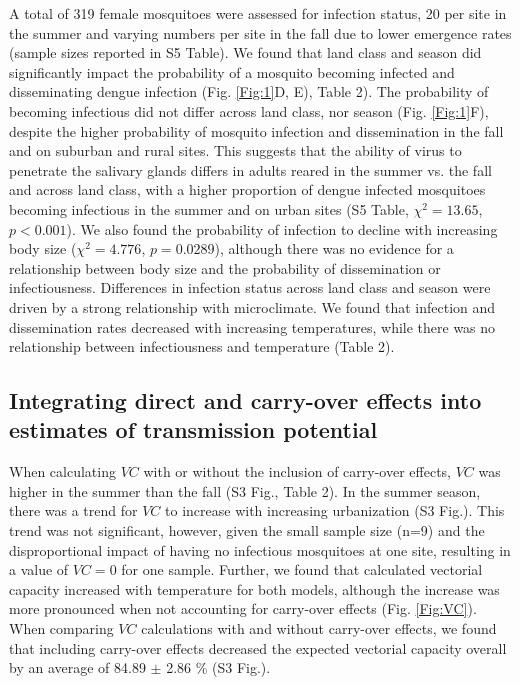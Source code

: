 \documentclass[12pt]{article}
\begin{document}
A total of 319 female mosquitoes were assessed for infection status, 20 per site in the summer and varying numbers per site in the fall due to lower emergence rates (sample sizes reported in S5 Table). We found that land class and season did significantly impact the probability of a mosquito becoming infected and disseminating dengue infection (Fig. \ref{Fig:1}D, E), Table 2). The probability of becoming infectious did not differ across land class, nor season (Fig. \ref{Fig:1}F), despite the higher probability of mosquito infection and dissemination in the fall and on suburban and rural sites. This suggests that the ability of virus to penetrate the salivary glands differs in adults reared in the summer vs. the fall and across land class, with a higher proportion of dengue infected mosquitoes becoming infectious in the summer and on urban sites (S5 Table, $\chi^2=13.65$, $p<0.001$). We also found the probability of infection to decline with increasing body size ($\chi^2=4.776$, $p=0.0289$), although there was no evidence for a relationship between body size and the probability of dissemination or infectiousness. Differences in infection status across land class and season were driven by a strong relationship with microclimate. We found that infection and dissemination rates decreased with increasing temperatures, while there was no relationship between infectiousness and temperature (Table 2).

\subsection{Integrating direct and carry-over effects into estimates of transmission potential}

When calculating $VC$ with or without the inclusion of carry-over effects, $VC$ was higher in the summer than the fall (S3 Fig., Table 2). In the summer season, there was a trend for $VC$ to increase with increasing urbanization (S3 Fig.). This trend was not significant, however, given the small sample size (n=9) and the disproportional impact of having no infectious mosquitoes at one site, resulting in a value of $VC=0$ for one sample. Further, we found that calculated vectorial capacity increased with temperature for both models, although the increase was more pronounced when not accounting for carry-over effects (Fig. \ref{Fig:VC}). When comparing $VC$ calculations with and without carry-over effects, we found that including carry-over effects decreased the expected vectorial capacity overall by an average of 84.89 $\pm$ 2.86 \% (S3 Fig.).
\end{document}
